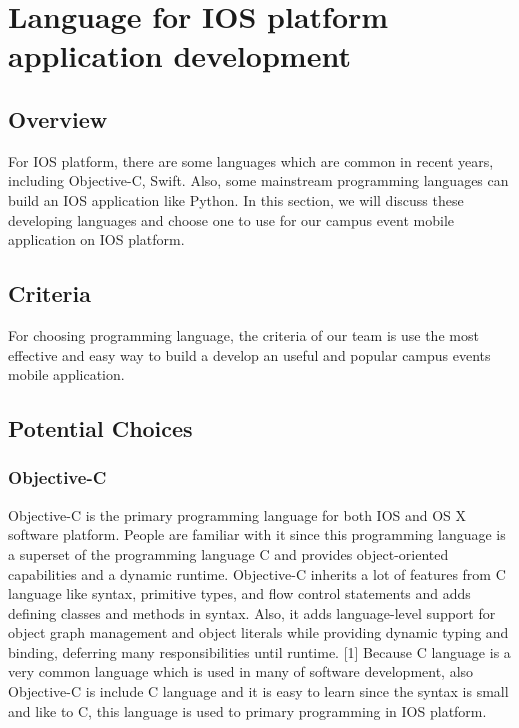 \documentclass[letterpaper, 10pt,titlepage]{article}
\begin{document}

\section{Language for IOS platform application development}

\subsection{Overview}
For IOS platform, there are some languages which are common in recent years, including Objective-C, Swift. Also, some mainstream programming languages can build an IOS application like Python. In this section, we will discuss these developing languages and choose one to use for our campus event mobile application on IOS platform.

\subsection{Criteria}
For choosing programming language, the criteria of our team is use the most effective and easy way to build a develop an useful and popular campus events mobile application. 

\subsection{Potential Choices}

\subsubsection{Objective-C}
Objective-C is the primary programming language for both IOS and OS X software platform. People are familiar with it since this programming language is a superset of the programming language C and provides object-oriented capabilities and a dynamic runtime. Objective-C inherits a lot of features from C language like syntax, primitive types, and flow control statements and adds defining classes and methods in syntax. Also, it adds language-level support for object graph management and object literals while providing dynamic typing and binding, deferring many responsibilities until runtime. [1] Because C language is a very common language which is used in many of software development, also Objective-C is include C language and it is easy to learn since the syntax is small and like to C, this language is used to primary programming in IOS platform. 
\end{document}
